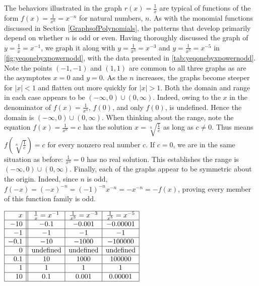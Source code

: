 The behaviors illustrated in the graph $r(x) = \frac{1}{x}$ are typical of functions of the form $f(x) = \frac{1}{x^n} = x^{-n}$ for natural numbers, $n$.  As with the monomial functions discussed in Section \ref{GraphsofPolynomials}, the patterns that develop primarily depend on whether $n$ is odd or even.  Having thoroughly discussed the graph of $y = \frac{1}{x} = x^{-1}$, we graph it along with $y = \frac{1}{x^3} = x^{-3}$ and $y = \frac{1}{x^5} = x^{-5}$ in \autoref{fig:yeqonebyxpowernodd}, with the data presented in \autoref{tab:yeqonebyxpowernodd}.  Note the points $(-1,-1)$ and $(1,1)$ are common to all three graphs as are the asymptotes $x = 0$ and $y = 0$.  As the $n$ increases, the graphs become steeper for $|x| < 1$  and flatten out more quickly for $|x|>1$.  Both the domain and range in each case appears to be $(-\infty, 0) \cup (0, \infty)$.  Indeed, owing to the $x$ in the denominator of $f(x) = \frac{1}{x^n}$, $f(0)$, and only $f(0)$,  is undefined. Hence the domain is $(-\infty, 0) \cup (0, \infty)$.  When thinking about the range, note the equation  $f(x)= \frac{1}{x^n}  = c$ has the solution $x = \sqrt[n]{\frac{1}{c}}$ as long as $c \neq 0$.  Thus means $f\left( \sqrt[n]{\frac{1}{c}} \right) = c$ for every nonzero real number $c$.  If $c = 0$, we are in the same situation as before:  $\frac{1}{x^n} = 0$ has no real solution.  This establishes the range is $(-\infty, 0) \cup (0, \infty)$.  Finally, each of the graphs appear to be symmetric about the origin.  Indeed, since $n$ is odd, $f(-x) = (-x)^{-n} = (-1)^{-n} x^{-n} = -x^{-n} = -f(x)$, proving every member of this function family is odd.  

\begin{table}
\begin{center}
  
$\begin{array}{|r||c|c|c|}  \hline

 x &  \frac{1}{x} = x^{-1} & \frac{1}{x^3} = x^{-3} & \frac{1}{x^5} = x^{-5} \\ \hline
 -10 & -0.1 &-0.001& -0.00001  \\  \hline
 -1 & -1 & -1&  -1\\  \hline
 -0.1 & -10 & -1000&  -100000 \\  \hline
 0 &  \text{undefined} &  \text{undefined}  &  \text{undefined}  \\  \hline
 0.1 & 10 & 1000&  100000 \\  \hline
 1 & 1 & 1&  1\\  \hline
 10 & 0.1 & 0.001& 0.00001  \\  \hline

\end{array}$

\caption{}
\label{tab:yeqonebyxpowernodd}
\end{center}
\end{table}

